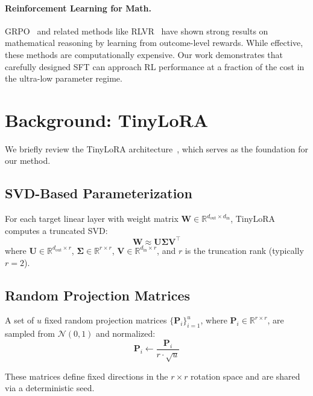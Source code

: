 \documentclass{article}
\newcommand{\R}{\mathbb{R}}
\newcommand{\bP}{\mathbf{P}}
\newcommand{\bU}{\mathbf{U}}
\newcommand{\bV}{\mathbf{V}}
\newcommand{\bW}{\mathbf{W}}
\begin{document}
\paragraph{Reinforcement Learning for Math.}
GRPO~\citep{shao2024deepseekmath} and related methods like RLVR~\citep{lambert2024tulu} have shown strong results on mathematical reasoning by learning from outcome-level rewards. While effective, these methods are computationally expensive. Our work demonstrates that carefully designed SFT can approach RL performance at a fraction of the cost in the ultra-low parameter regime.

\section{Background: TinyLoRA}
\label{sec:background}

We briefly review the TinyLoRA architecture~\citep{morris2026tinylora}, which serves as the foundation for our method.

\subsection{SVD-Based Parameterization}

For each target linear layer with weight matrix $\bW \in \R^{d_{\text{out}} \times d_{\text{in}}}$, TinyLoRA computes a truncated SVD:
\begin{equation}
  \bW \approx \bU \boldsymbol{\Sigma} \bV^\top
  \label{eq:svd}
\end{equation}
where $\bU \in \R^{d_{\text{out}} \times r}$, $\boldsymbol{\Sigma} \in \R^{r \times r}$, $\bV \in \R^{d_{\text{in}} \times r}$, and $r$ is the truncation rank (typically $r = 2$).

\subsection{Random Projection Matrices}

A set of $u$ fixed random projection matrices $\{\bP_i\}_{i=1}^{u}$, where $\bP_i \in \R^{r \times r}$, are sampled from $\mathcal{N}(0, 1)$ and normalized:
\begin{equation}
  \bP_i \leftarrow \frac{\bP_i}{r \cdot \sqrt{u}}
  \label{eq:p_norm}
\end{equation}

These matrices define fixed directions in the $r \times r$ rotation space and are shared via a deterministic seed.
\end{document}
